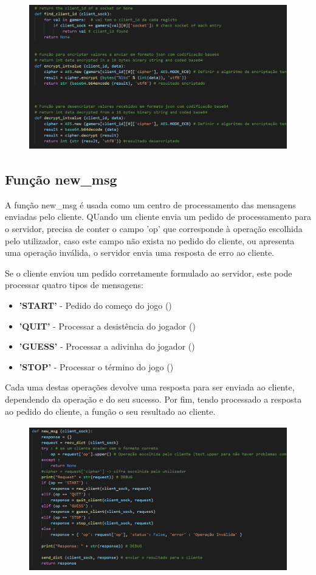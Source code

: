 \documentclass{report}
\begin{document}
\begin{figure}[!h]
\center
\includegraphics[height = 180pt]{img/cryptofindid.png}
\end{figure}

\subsection{Função new\_msg}
\label{ssec:func_new_msg}

A função new\_msg é usada como um centro de processamento das mensagens enviadas pelo cliente. QUando um cliente envia um pedido de processamento para o servidor, precisa de conter o campo 'op' que corresponde à operação escolhida pelo utilizador, caso este campo não exista no pedido do cliente, ou apresenta uma operação inválida, o servidor envia uma resposta de erro ao cliente.

Se o cliente enviou um pedido corretamente formulado ao servidor, este pode processar quatro tipos de mensagens:
\begin{itemize}
\item \textbf{'START'} - Pedido do começo do jogo ()
\item \textbf{'QUIT'} - Processar a desistência do jogador ()
\item \textbf{'GUESS'} - Processar a adivinha do jogador ()
\item \textbf{'STOP'} - Processar o término do jogo ()
\end{itemize}
Cada uma destas operações devolve uma resposta para ser enviada ao cliente, dependendo da operação e do seu sucesso. Por fim, tendo processado a resposta ao pedido do cliente, a função o seu resultado ao cliente. 

\begin{figure}[!h]
\center
\includegraphics[height = 180pt]{img/newmsg.png}
\end{figure}
\end{document}
